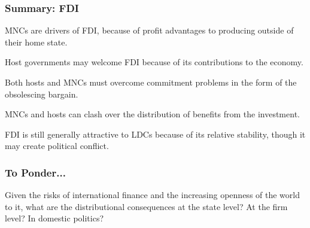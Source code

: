 \documentclass[handout]{beamer}
\begin{document}
\begin{frame} 
	\frametitle{\LARGE{Summary: FDI}}
	\begin{itemize}
		\large{
			\item MNCs are drivers of FDI, because of profit advantages to producing outside of their home state.  \pause 
			
			\item Host governments may welcome FDI because of its contributions to the economy. \pause 
			
			\item Both hosts and MNCs must overcome commitment problems in the form of the obsolescing bargain. \pause 
			
			\item MNCs and hosts can clash over the distribution of benefits from the investment. \pause 
			
			\item FDI is still generally attractive to LDCs because of its relative stability, though it may create political conflict.
		}
	\end{itemize}
\end{frame}

\begin{frame} 
\frametitle{\LARGE{To Ponder...}}
    \centering
    \Large{Given the risks of international finance and the increasing openness of the world to it, what are the distributional consequences at the state level? At the firm level? In domestic politics? }
\end{frame}
\end{document}

